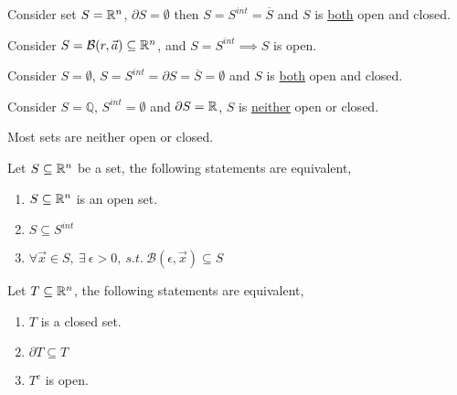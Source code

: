 \documentclass[]{article}
\newcommand{\ball}[2]{\mathcal{B}({#1}, {#2})}
\begin{document}
	\begin{example}
		Consider set $S = \mathbb{R}^n$, $\partial S = \emptyset$ then $S = S^{int} = \overline{S}$ and $S$ is \ul{both} open and closed.
	\end{example}
	
	\begin{example}
		Consider $S = \ball{r}{\vec{a}} \subseteq \R^n$, and $S = S^{int} \implies S$ is open.
	\end{example}
	
	\begin{example}
		Consider $S = \emptyset$, $S = S^{int} = \partial S = \overline{S} = \emptyset$ and $S$ is \ul{both} open and closed.
	\end{example}
	
	\begin{example}
		Consider $S = \mathbb{Q}$, $S^{int} = \emptyset$ and $\partial S = \mathbb{R}$, $S$ is \ul{neither} open or closed.
	\end{example}
	
	\begin{remark}
		Most sets are neither open or closed.
	\end{remark}
	
	\begin{theorem}
		Let $S\subseteq \mathbb{R}^n$ be a set, the following statements are equivalent,
		\begin{enumerate}
			\item $S \subseteq \mathbb{R}^n$ is an open set.
			\item $S \subseteq S^{int}$
			\item $\forall \vec{x} \in S,\ \exists\ \epsilon > 0,\ s.t.\ \ball{\epsilon}{\vec{x}} \subseteq S$
		\end{enumerate}
	\end{theorem}
	
	\begin{theorem}
		Let $T \subseteq \mathbb{R}^n$, the following statements are equivalent,
		\begin{enumerate}
			\item $T$ is a closed set.
			\item $\partial T \subseteq T$
			\item $T^c$ is open.
		\end{enumerate}
	\end{theorem}
	
\end{document}
